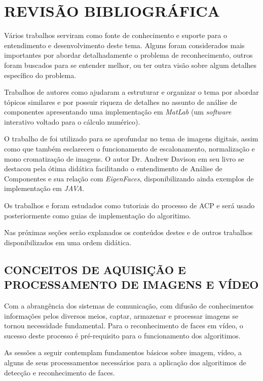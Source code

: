 
\chapter{REVISÃO BIBLIOGRÁFICA}\label{ch:rev-bibs}

Vários trabalhos serviram como fonte de conhecimento e suporte para o entendimento e desenvolvimento deste tema. Alguns foram considerados mais importantes por abordar detalhadamente o problema de reconhecimento, outros foram buscados para se entender melhor, ou ter outra visão sobre algum detalhes específico do problema.

Trabalhos de autores como \cite{geysilva} ajudaram a estruturar e organizar o tema por abordar tópicos similares e por possuir riqueza de detalhes no assunto de análise de componentes apresentando uma implementação em \textit{MatLab} (um \textit{software} interativo voltado para o cálculo numérico).

O trabalho de \cite{img-digital-willians} foi utilizado para se aprofundar no tema de imagens digitais, assim como  \cite{gonzalez_woods} que também esclareceu o funcionamento de escalonamento, normalização e mono cromatização de imagens. O autor Dr. Andrew Davison em seu livro \cite{drmathew_java_programming} se destacou pela ótima didática facilitando o entendimento de Análise de Componentes e sua relação com \textit{EigenFaces}, disponibilizando ainda exemplos de implementação em \textit{JAVA}. 

Os trabalhos \cite{tutorial_en_smith} e \cite{tutorial_pt} foram estudados como tutoriais do processo de ACP e será usado posteriormente como guias de implementação do algoritimo.

Nas próximas seções serão explanados os conteúdos destes e de outros trabalhos disponibilizados em uma ordem didática.


\section{CONCEITOS DE AQUISIÇÃO E PROCESSAMENTO DE IMAGENS E VÍDEO}\label{sec:processamento_imagens}

Com a abrangência dos sistemas de comunicação, com difusão de conhecimentos informações pelos diversos meios, captar, armazenar e processar imagens se tornou necessidade fundamental. Para o reconhecimento de faces em vídeo, o sucesso deste processo é pré-requisito  para o funcionamento dos algoritimos. 

As sessões a seguir contemplam fundamentos básicos sobre imagem, vídeo, a alguns de seus processamentos necessários para a aplicação dos algoritimos de detecção e reconhecimento de faces.


